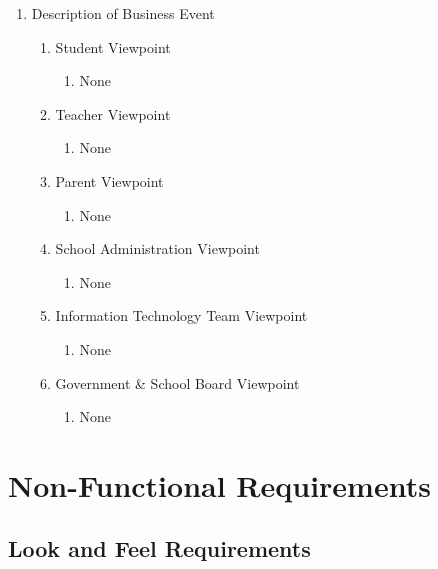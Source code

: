 \documentclass[]{article}
\begin{document}
\begin{enumerate}[{BE}1.]
	\item Description of Business Event
	\begin{enumerate}[{VP1}.1]
		\item Student Viewpoint
			\begin{enumerate}
				\item None
			\end{enumerate}
		\item Teacher Viewpoint
			\begin{enumerate}
				\item None
			\end{enumerate}
		\item Parent Viewpoint
			\begin{enumerate}
				\item None
			\end{enumerate}
		\item School Administration Viewpoint
			\begin{enumerate}
				\item None
			\end{enumerate}
		\item Information Technology Team Viewpoint
			\begin{enumerate}
				\item None
			\end{enumerate}
		\item Government \& School Board Viewpoint
			\begin{enumerate}
				\item None
			\end{enumerate}
	\end{enumerate}

\end{enumerate}


\section{Non-Functional Requirements}
\label{sec:non-functional_requirements}
\subsection{Look and Feel Requirements}
\label{sub:look_and_feel_requirements}
\end{document}
